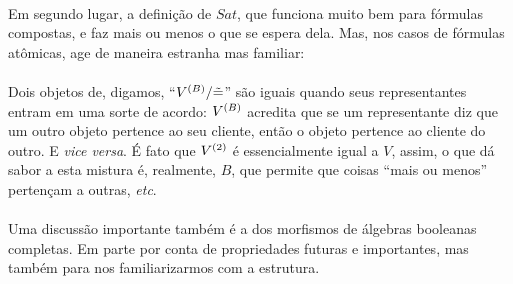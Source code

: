     \paragraph{}
        Em segundo lugar, a definição de $Sat$, que funciona 
        muito bem para fórmulas compostas, e faz mais ou menos 
        o que se espera dela. Mas, nos casos de fórmulas 
        atômicas, age de maneira estranha mas familiar:
    \paragraph{}
        Dois objetos de, digamos, ``${V^{(B)}}\slash{\tilde=}$''
        são iguais quando seus representantes entram em uma 
        sorte de acordo: $V^{(B)}$ acredita que se um representante
        diz que um outro objeto pertence ao seu cliente, então 
        o objeto pertence ao cliente do outro. E \textit{vice 
        versa}. É fato que $V^{(2)}$ é essencialmente igual a $V$, 
        assim, o que dá sabor a esta mistura é, realmente, $B$,
        que permite que coisas ``mais ou menos'' pertençam a 
        outras, \textit{etc}.
    \paragraph{}
        Uma discussão importante também é a dos morfismos de 
        álgebras booleanas completas. Em parte por conta de 
        propriedades futuras e importantes, mas também para 
        nos familiarizarmos com a estrutura.

